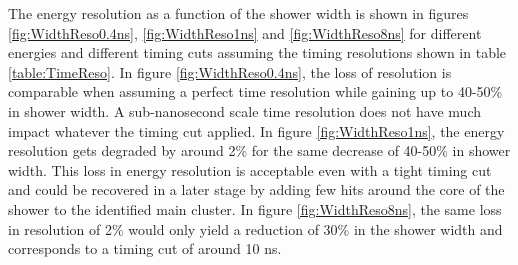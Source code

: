 The energy resolution as a function of the shower width is shown in figures \ref{fig:WidthReso0.4ns}, \ref{fig:WidthReso1ns} and \ref{fig:WidthReso8ns} for different \kzeroL{} energies and different timing cuts assuming the timing resolutions shown in table \ref{table:TimeReso}. In figure \ref{fig:WidthReso0.4ns}, the loss of resolution is comparable when assuming a perfect time resolution while gaining up to 40-50\% in shower width. A sub-nanosecond scale time resolution does not have much impact whatever the timing cut applied. In figure \ref{fig:WidthReso1ns}, the energy resolution gets degraded by around 2\% for the same decrease of 40-50\% in shower width. This loss in energy resolution is acceptable even with a tight timing cut and could be recovered in a later stage by adding few hits around the core of the shower to the identified main cluster. In figure \ref{fig:WidthReso8ns}, the same loss in resolution of 2\% would only yield a reduction of 30\% in the shower width and corresponds to a timing cut of around 10 ns.

